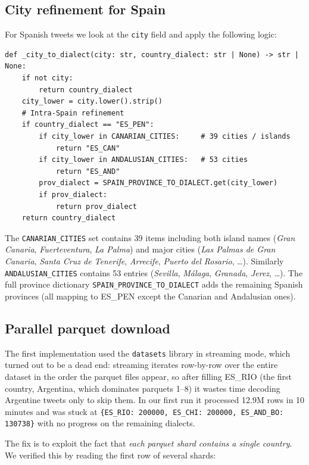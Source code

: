 \documentclass[11pt,a4paper]{article}
\begin{document}
\subsection{City refinement for Spain}

For Spanish tweets we look at the \texttt{city} field and apply the
following logic:

\begin{lstlisting}[style=pycode,caption={City refinement for Spanish tweets.}]
def _city_to_dialect(city: str, country_dialect: str | None) -> str | None:
    if not city:
        return country_dialect
    city_lower = city.lower().strip()
    # Intra-Spain refinement
    if country_dialect == "ES_PEN":
        if city_lower in CANARIAN_CITIES:     # 39 cities / islands
            return "ES_CAN"
        if city_lower in ANDALUSIAN_CITIES:   # 53 cities
            return "ES_AND"
        prov_dialect = SPAIN_PROVINCE_TO_DIALECT.get(city_lower)
        if prov_dialect:
            return prov_dialect
    return country_dialect
\end{lstlisting}

The \texttt{CANARIAN\_CITIES} set contains 39 items including both
island names (\emph{Gran Canaria}, \emph{Fuerteventura}, \emph{La Palma})
and major cities (\emph{Las Palmas de Gran Canaria}, \emph{Santa Cruz de
Tenerife}, \emph{Arrecife}, \emph{Puerto del Rosario}, \ldots).
Similarly \texttt{ANDALUSIAN\_CITIES} contains 53 entries (\emph{Sevilla},
\emph{Málaga}, \emph{Granada}, \emph{Jerez}, \ldots). The full province
dictionary \texttt{SPAIN\_PROVINCE\_TO\_DIALECT} adds the remaining
Spanish provinces (all mapping to ES\_PEN except the Canarian and
Andalusian ones).

\subsection{Parallel parquet download}

The first implementation used the \texttt{datasets} library in streaming
mode, which turned out to be a dead end: streaming iterates row-by-row
over the entire dataset in the order the parquet files appear, so after
filling ES\_RIO (the first country, Argentina, which dominates parquets
1--8) it wastes time decoding Argentine tweets only to skip them. In our
first run it processed 12.9M rows in 10 minutes and was stuck at
\texttt{\{ES\_RIO: 200000, ES\_CHI: 200000, ES\_AND\_BO: 130738\}} with
no progress on the remaining dialects.

The fix is to exploit the fact that \emph{each parquet shard contains a
single country}. We verified this by reading the first row of several
shards:
\end{document}
